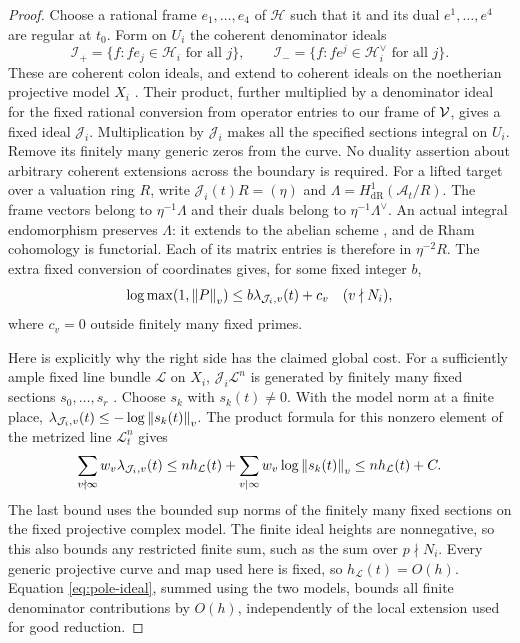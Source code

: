 \begin{proof}
Choose a rational frame $e_1,\ldots,e_4$ of $\mathcal H$ such that it
and its dual $e^1,\ldots,e^4$ are regular at $t_0$.  Form on $U_i$ the
coherent denominator ideals
\[
 \mathcal I_+=\{f:f e_j\in\mathcal H_i\text{ for all }j\},
 \qquad
 \mathcal I_-=\{f:f e^j\in\mathcal H_i^\vee\text{ for all }j\}.
\]
These are coherent colon ideals, and extend to coherent ideals on
the noetherian projective model $X_i$
\cite[Lemma~28.23.1(2), Tag~01PE]{StacksProject}.  Their product, further
multiplied by a denominator ideal for the fixed rational conversion
from operator entries to our frame of $\mathcal V$, gives a fixed ideal
$\mathcal J_i$.  Multiplication by $\mathcal J_i$ makes all the
specified sections integral on $U_i$.  Remove its finitely many
generic zeros from the curve.  No duality assertion about arbitrary
coherent extensions across the boundary is required.
For a lifted target over a valuation ring $R$, write
$\mathcal J_i(t)R=(\eta)$ and
$\Lambda=H^1_{\mathrm{dR}}(\mathcal A_t/R)$.  The frame vectors
belong to $\eta^{-1}\Lambda$ and their duals belong to
$\eta^{-1}\Lambda^\vee$.  An actual integral endomorphism preserves
$\Lambda$: it extends to the abelian scheme
\cite[Section~1.2, Proposition~8]{BLR1990}, and de Rham cohomology
is functorial.  Each of its matrix entries is therefore in
$\eta^{-2}R$.  The extra fixed conversion of coordinates gives,
for some fixed integer $b$,
\begin{equation}\label{eq:pole-ideal}
 \log\max(1,\left\lVert P\right\rVert_v)
       \le b\lambda_{\mathcal J_i,v}(t)+c_v
       \quad(v\nmid N_i),
\end{equation}
where $c_v=0$ outside finitely many fixed primes.

Here is explicitly why the right side has the claimed global cost.
For a sufficiently ample fixed line bundle $\mathcal L$ on $X_i$,
$\mathcal J_i\mathcal L^n$ is generated by finitely many fixed
sections $s_0,\ldots,s_r$
\cite[Proposition~28.27.13(7), Tag~01Q3]{StacksProject}.
Choose $s_k$ with $s_k(t)\ne0$.
With the model norm at a finite place,
$\lambda_{\mathcal J_i,v}(t)\le-\log\left\lVert s_k(t)\right\rVert_v$.
The product formula for this nonzero element of the metrized line
$\mathcal L_t^n$ gives
\[
 \sum_{v\nmid\infty}w_v\lambda_{\mathcal J_i,v}(t)
 \le n h_{\mathcal L}(t)
       +\sum_{v\mid\infty}w_v\log\left\lVert s_k(t)\right\rVert_v
 \le n h_{\mathcal L}(t)+C.
\]
The last bound uses the bounded sup norms of the finitely many
fixed sections on the fixed projective complex model.  The finite
ideal heights are nonnegative, so this also bounds any restricted
finite sum, such as the sum over $p\nmid N_i$.
Every generic projective curve and map used here is fixed, so
$h_{\mathcal L}(t)=O(h)$.  Equation \eqref{eq:pole-ideal}, summed
using the two models, bounds all finite denominator contributions
by $O(h)$, independently of the local extension used for good
reduction.


\end{proof}

